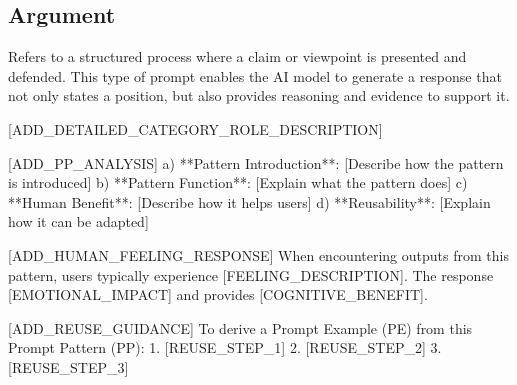 
\subsection{Argument}
\label{subsec:Argument}
Refers to a structured process where a claim or viewpoint is presented and defended. This type of prompt enables the AI model to generate a response that not only states a position, but also provides reasoning and evidence to support it.

[ADD_DETAILED_CATEGORY_ROLE_DESCRIPTION]

[ADD_PP_ANALYSIS]
a) **Pattern Introduction**: [Describe how the pattern is introduced]
b) **Pattern Function**: [Explain what the pattern does]
c) **Human Benefit**: [Describe how it helps users]
d) **Reusability**: [Explain how it can be adapted]

[ADD_HUMAN_FEELING_RESPONSE]
When encountering outputs from this pattern, users typically experience [FEELING_DESCRIPTION]. 
The response [EMOTIONAL_IMPACT] and provides [COGNITIVE_BENEFIT].

[ADD_REUSE_GUIDANCE]
To derive a Prompt Example (PE) from this Prompt Pattern (PP):
1. [REUSE_STEP_1]
2. [REUSE_STEP_2] 
3. [REUSE_STEP_3]


